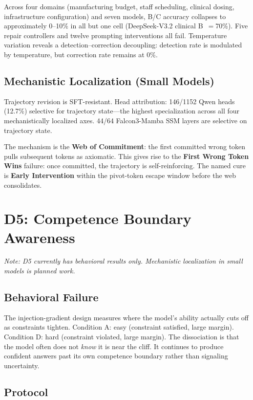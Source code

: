 \documentclass[11pt]{article}
\begin{document}
Across four domains (manufacturing budget, staff scheduling, clinical
dosing, infrastructure configuration) and seven models, B/C accuracy
collapses to approximately 0--10\% in all but one cell (DeepSeek-V3.2
clinical B~$= 70$\%). Five repair controllers and twelve prompting
interventions all fail. Temperature variation reveals a
detection--correction decoupling: detection rate is modulated by
temperature, but correction rate remains at 0\%.

\subsection{Mechanistic Localization (Small Models)}

Trajectory revision is SFT-resistant. Head attribution: 146/1152 Qwen
heads (12.7\%) selective for trajectory state---the highest specialization
across all four mechanistically localized axes. 44/64 Falcon3-Mamba SSM
layers are selective on trajectory state.

The mechanism is the \textbf{Web of Commitment}: the first committed
wrong token pulls subsequent tokens as axiomatic. This gives rise to the
\textbf{First Wrong Token Wins} failure: once committed, the trajectory
is self-reinforcing. The named cure is \textbf{Early Intervention} within
the pivot-token escape window before the web consolidates.

\section{D5: Competence Boundary Awareness}
\label{sec:d5}

\textit{Note: D5 currently has behavioral results only. Mechanistic
localization in small models is planned work.}

\subsection{Behavioral Failure}

The injection-gradient design measures where the model's ability actually
cuts off as constraints tighten. Condition A: easy (constraint satisfied,
large margin). Condition D: hard (constraint violated, large margin). The
dissociation is that the model often does not \textit{know} it is near
the cliff. It continues to produce confident answers past its own
competence boundary rather than signaling uncertainty.

\subsection{Protocol}
\end{document}
